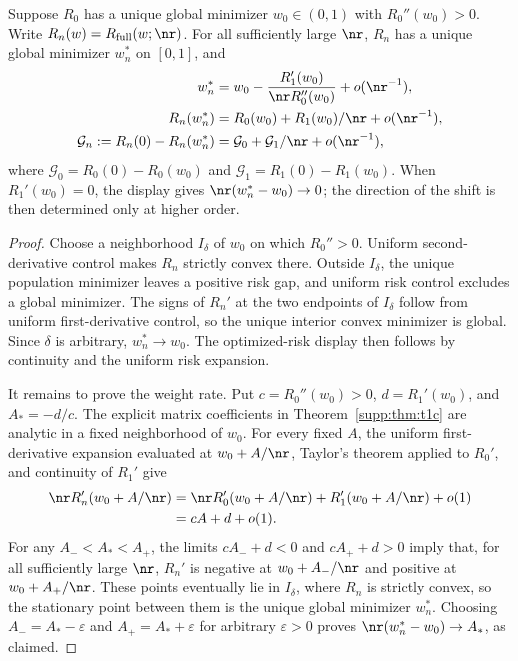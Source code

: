 \begin{theorem}\label{supp:thm:optfull}
Suppose $R_0$ has a unique global minimizer $w_0\in(0,1)$ with $R_0''(w_0)>0$. Write $R_n(w)=R_{\mathrm{full}}(w;\nr)$. For all sufficiently large $\nr$, $R_n$ has a unique global minimizer $w_n^*$ on $[0,1]$, and
\begin{align}
 w_n^*&=w_0-\frac{R_1'(w_0)}{\nr R_0''(w_0)}+o(\nr^{-1}),\notag\\
 R_n(w_n^*)&=R_0(w_0)+R_1(w_0)/\nr+o(\nr^{-1}),\\
 \mathcal G_n:=R_n(0)-R_n(w_n^*)&=\mathcal G_0+\mathcal G_1/\nr+o(\nr^{-1}),\notag
\end{align}
where $\mathcal G_0=R_0(0)-R_0(w_0)$ and $\mathcal G_1=R_1(0)-R_1(w_0)$. When $R_1'(w_0)=0$, the display gives $\nr(w_n^*-w_0)\to0$; the direction of the shift is then determined only at higher order.
\end{theorem}

\begin{proof}
Choose a neighborhood $I_\delta$ of $w_0$ on which $R_0''>0$. Uniform second-derivative control makes $R_n$ strictly convex there. Outside $I_\delta$, the unique population minimizer leaves a positive risk gap, and uniform risk control excludes a global minimizer. The signs of $R_n'$ at the two endpoints of $I_\delta$ follow from uniform first-derivative control, so the unique interior convex minimizer is global. Since $\delta$ is arbitrary, $w_n^*\to w_0$. The optimized-risk display then follows by continuity and the uniform risk expansion.

It remains to prove the weight rate. Put $c=R_0''(w_0)>0$, $d=R_1'(w_0)$, and $A_*=-d/c$. The explicit matrix coefficients in Theorem~\ref{supp:thm:t1c} are analytic in a fixed neighborhood of $w_0$. For every fixed $A$, the uniform first-derivative expansion evaluated at $w_0+A/\nr$, Taylor's theorem applied to $R_0'$, and continuity of $R_1'$ give
\begin{align}
 \nr R_n'(w_0+A/\nr)
 &=\nr R_0'(w_0+A/\nr)+R_1'(w_0+A/\nr)+o(1)\notag\\
 &=cA+d+o(1).
 \label{supp:eq:scaled-optimal-derivative}
\end{align}
For any $A_-<A_*<A_+$, the limits $cA_-+d<0$ and $cA_++d>0$ imply that, for all sufficiently large $\nr$, $R_n'$ is negative at $w_0+A_-/\nr$ and positive at $w_0+A_+/\nr$. These points eventually lie in $I_\delta$, where $R_n$ is strictly convex, so the stationary point between them is the unique global minimizer $w_n^*$. Choosing $A_-=A_*-\varepsilon$ and $A_+=A_*+\varepsilon$ for arbitrary $\varepsilon>0$ proves $\nr(w_n^*-w_0)\to A_*$, as claimed.
\end{proof}

